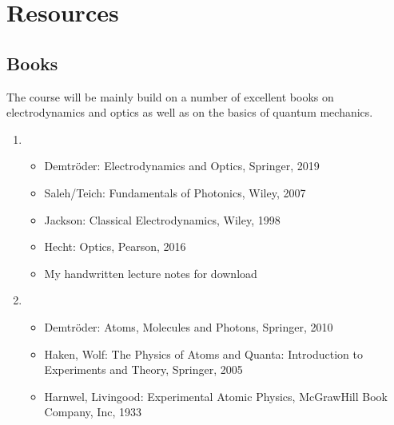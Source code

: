 \documentclass[letterpaper,10pt,english]{sphinxmanual}
\begin{document}
\chapter{Resources}
\label{\detokenize{course-info/resources:resources}}\label{\detokenize{course-info/resources::doc}}

\section{Books}
\label{\detokenize{course-info/resources:books}}
\sphinxAtStartPar
The course will be mainly build on a number of excellent books on electrodynamics and optics as well as on the basics of quantum mechanics.
\begin{enumerate}
%
\item {} 
\sphinxAtStartPar
{}
\begin{itemize}
\item {} 
\sphinxAtStartPar
Demtröder: Electrodynamics and Optics, Springer, 2019

\item {} 
\sphinxAtStartPar
Saleh/Teich: Fundamentals of Photonics, Wiley, 2007

\item {} 
\sphinxAtStartPar
Jackson: Classical Electrodynamics, Wiley, 1998

\item {} 
\sphinxAtStartPar
Hecht: Optics, Pearson, 2016

\item {} 
\sphinxAtStartPar
My handwritten lecture notes for download 

\end{itemize}

\item {} 
\sphinxAtStartPar
{}
\begin{itemize}
\item {} 
\sphinxAtStartPar
Demtröder: Atoms, Molecules and Photons, Springer, 2010

\item {} 
\sphinxAtStartPar
Haken, Wolf: The Physics of Atoms and Quanta: Introduction to Experiments and Theory, Springer, 2005

\item {} 
\sphinxAtStartPar
Harnwel, Livingood: Experimental Atomic Physics, McGraw\sphinxhyphen{}Hill Book Company, Inc, 1933

\end{itemize}

\end{enumerate}
\end{document}
